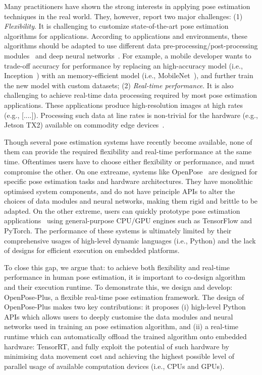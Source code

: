 \documentclass[twoside,11pt]{article}
\begin{document}
Many practitioners have shown the strong interests in applying 
pose estimation techniques in the real world.
They, however, report two major challenges: (1) \emph{Flexibility}.
It is challenging to customize state-of-the-art pose estimation
algorithms for applications. 
According
to applications and environments,
these algorithms should be adapted to use different
data pre-processing/post-processing modules~\citep{x1, x2}
and deep neural networks~\citep{x1, x2, x3}.
For example, a mobile developer 
wants to trade-off accuracy for
performance by replacing an high-accuracy
model (i.e., Inception~\citep{x}) with an memory-efficient model (i.e., MobileNet~\citep{x}), and further train the new model
with custom datasets;
(2) \emph{Real-time performance}. It is also challenging to achieve real-time data processing
required by most pose estimation applications.
These applications produce high-resolution images
at high rates (e.g., [....]). Processing such data at line rates 
is non-trivial for the
hardware (e.g., Jetson TX2) available on commodity edge devices~\citep{evidence}.

Though several pose estimation systems have recently become available,
none of them can provide the required flexibility 
and real-time performance at the same time. 
Oftentimes users have to choose either flexibility
or performance, and must compromise the other.
On one extreame, systems like OpenPose~\citep{x}
are designed for specific pose estimation tasks and hardware architectures.
They have monolithic optimised system components,
and do not have principle APIs to alter the choices of 
data modules and neural networks, making
them rigid and brittle to be adapted.
On the other extreme, users can quickly prototype
pose estimation applications~\citep{x1, x2}
using general-purpose 
CPU/GPU engines such as TensorFlow and PyTorch. 
The performance of these systems is ultimately
limited by their comprehensive usages of high-level dynamic
languages (i.e., Python) and the lack of designs for
efficient execution on embedded platforms.

To close this gap, we argue that: to achieve both
flexibility and real-time performance in 
human pose estimation, it is important
to co-design algorithm and their execution runtime.
To demonstrate this, we design and develop: OpenPose-Plus,
a flexible real-time pose estimation framework.
The design of OpenPose-Plus makes two key contributions: it proposes
(i) high-level Python APIs which allows users
to deeply customise the data modules
and neural networks used in training an pose estimation
algorithm, and (ii) a real-time runtime which
can automatically offload the trained algorithm
onto embedded hardware: TensorRT, and 
fully exploit the potential of such hardware by 
minimising data movement cost and achieving the highest possible
level of parallel usage of available computation devices (i.e., CPUs and GPUs). 
\end{document}
